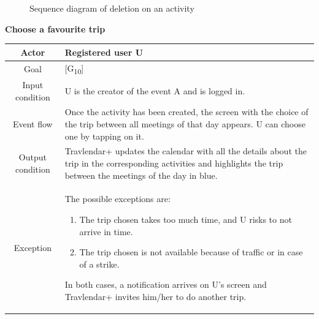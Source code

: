 \documentclass[12pt,titlepage]{article}
\begin{document}
\begin{figure}
\centering
{} 
\caption{Sequence diagram of deletion on an activity}
\end{figure}
\clearpage
\newpage


\begin{flushleft}
\textbf{Choose a favourite trip}
\end{flushleft}

\begin{tabular}{cp{10cm}} 
Actor&Registered user U \\ \hline 
Goal& {[G\textsubscript{10}]}\\ \hline
Input condition&U is the creator of the event A and is logged in.\\ \hline
Event flow&Once the activity has been created, the screen with the choice of the trip between all meetings of that day appears. U can choose one by tapping on it. \\ \hline
Output condition& Travlendar+ updates the calendar with all the details about the trip in the corresponding activities and highlights the trip between the meetings of the day in blue. 
\\ \hline
Exception& The possible exceptions are:
\begin{enumerate}
\item The trip chosen takes too much time, and U risks to not arrive in time. 
\item The trip chosen is not available because of traffic or in case of a strike. 
\end{enumerate} 
In both cases, a notification arrives on U's screen and Travlendar+ invites him/her to do another trip. \\ \hline 

\end{tabular}
\end{document}
